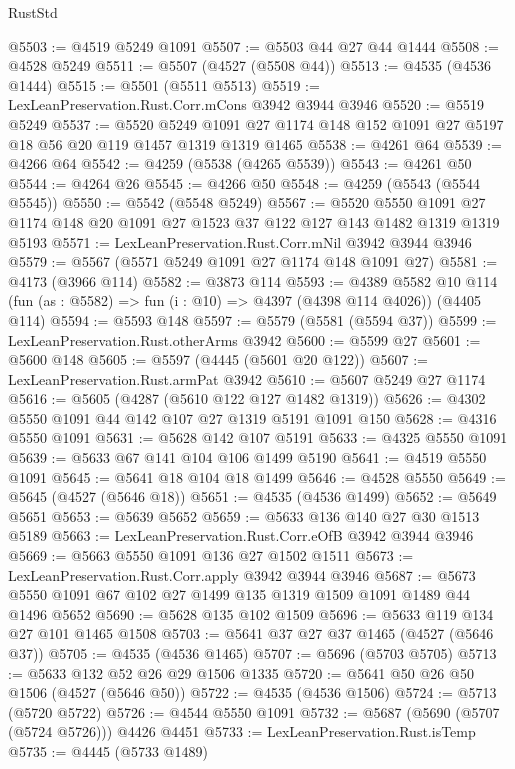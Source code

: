\begin{lexlean}{RustStd}
\begin{coremodule}
{\begin{coremodule}
{{{{{{{{{{{{{{{{{{{{{{{{{{{{{{{{{{{{{{@5503 := @4519 @5249 @1091
@5507 := @5503 @44 @27 @44 @1444
@5508 := @4528 @5249
@5511 := @5507 (@4527 (@5508 @44))
@5513 := @4535 (@4536 @1444)
@5515 := @5501 (@5511 @5513)
@5519 := LexLeanPreservation.Rust.Corr.mCons @3942 @3944 @3946
@5520 := @5519 @5249
@5537 := @5520
    @5249
    @1091
    @27
    @1174
    @148
    @152
    @1091
    @27
    @5197
    @18
    @56
    @20
    @119
    @1457
    @1319
    @1319
    @1465
@5538 := @4261 @64
@5539 := @4266 @64
@5542 := @4259 (@5538 (@4265 @5539))
@5543 := @4261 @50
@5544 := @4264 @26
@5545 := @4266 @50
@5548 := @4259 (@5543 (@5544 @5545))
@5550 := @5542 (@5548 @5249)
@5567 := @5520
    @5550
    @1091
    @27
    @1174
    @148
    @20
    @1091
    @27
    @1523
    @37
    @122
    @127
    @143
    @1482
    @1319
    @1319
    @5193
@5571 := LexLeanPreservation.Rust.Corr.mNil @3942 @3944 @3946
@5579 := @5567 (@5571 @5249 @1091 @27 @1174 @148 @1091 @27)
@5581 := @4173 (@3966 @114)
@5582 := @3873 @114
@5593 := @4389
    @5582
    @10
    @114
    (fun (as : @5582) => fun (i : @10) => @4397 (@4398 @114 @4026))
    (@4405 @114)
@5594 := @5593 @148
@5597 := @5579 (@5581 (@5594 @37))
@5599 := LexLeanPreservation.Rust.otherArms @3942
@5600 := @5599 @27
@5601 := @5600 @148
@5605 := @5597 (@4445 (@5601 @20 @122))
@5607 := LexLeanPreservation.Rust.armPat @3942
@5610 := @5607 @5249 @27 @1174
@5616 := @5605 (@4287 (@5610 @122 @127 @1482 @1319))
@5626 := @4302 @5550 @1091 @44 @142 @107 @27 @1319 @5191 @1091 @150
@5628 := @4316 @5550 @1091
@5631 := @5628 @142 @107 @5191
@5633 := @4325 @5550 @1091
@5639 := @5633 @67 @141 @104 @106 @1499 @5190
@5641 := @4519 @5550 @1091
@5645 := @5641 @18 @104 @18 @1499
@5646 := @4528 @5550
@5649 := @5645 (@4527 (@5646 @18))
@5651 := @4535 (@4536 @1499)
@5652 := @5649 @5651
@5653 := @5639 @5652
@5659 := @5633 @136 @140 @27 @30 @1513 @5189
@5663 := LexLeanPreservation.Rust.Corr.eOfB @3942 @3944 @3946
@5669 := @5663 @5550 @1091 @136 @27 @1502 @1511
@5673 := LexLeanPreservation.Rust.Corr.apply @3942 @3944 @3946
@5687 := @5673 @5550 @1091 @67 @102 @27 @1499 @135 @1319 @1509 @1091 @1489 @44 @1496 @5652
@5690 := @5628 @135 @102 @1509
@5696 := @5633 @119 @134 @27 @101 @1465 @1508
@5703 := @5641 @37 @27 @37 @1465 (@4527 (@5646 @37))
@5705 := @4535 (@4536 @1465)
@5707 := @5696 (@5703 @5705)
@5713 := @5633 @132 @52 @26 @29 @1506 @1335
@5720 := @5641 @50 @26 @50 @1506 (@4527 (@5646 @50))
@5722 := @4535 (@4536 @1506)
@5724 := @5713 (@5720 @5722)
@5726 := @4544 @5550 @1091
@5732 := @5687 (@5690 (@5707 (@5724 @5726))) @4426 @4451
@5733 := LexLeanPreservation.Rust.isTemp
@5735 := @4445 (@5733 @1489)
}}}}}}}}}}}}}}}}}}}}}}}}}}}}}}}}}}}}}}
\end{coremodule}}
\end{coremodule}
\end{lexlean}
